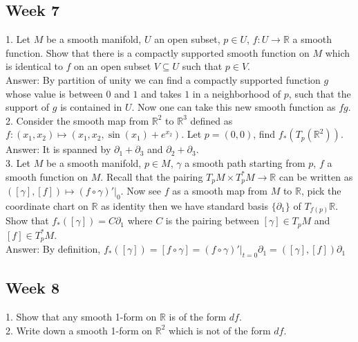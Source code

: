 \documentclass{article}
\theoremstyle{definition}
\begin{document}
\subsection{Week 7}

1. Let $M$ be a smooth manifold, $U$ an open subset, $p\in U$, $f: U\rightarrow \mathbb{R}$ a smooth function. Show that there is a compactly supported smooth function on $M$ which is identical to $f$ on an open subset $V\subseteq U$ such that $p\in V$.\\

Answer: By partition of unity we can find a compactly supported function $g$ whose value is between $0$ and $1$ and takes $1$ in a neighborhood of $p$, such that the support of $g$ is contained in $U$. Now one can take this new smooth function as $fg$.\\

2. Consider the smooth map from $\mathbb{R}^2$ to $\mathbb{R}^3$ defined as $f: (x_1, x_2)\mapsto (x_1, x_2, \sin(x_1)+e^{x_2})$. Let $p=(0, 0)$, find $f_*(T_p(\mathbb{R}^2))$.\\

Answer: It is spanned by $\partial_1+\partial_3$ and $\partial_2+\partial_3$.\\

3. Let $M$ be a smooth manifold, $p\in M$, $\gamma$ a smooth path starting from $p$, $f$ a smooth function on $M$. Recall that the pairing $T_pM\times T^*_pM\rightarrow \mathbb{R}$ can be written as $([\gamma], [f])\mapsto (f\circ \gamma)'|_0$. Now see $f$ as a smooth map from $M$ to $\mathbb{R}$, pick the coordinate chart on $\mathbb{R}$ as identity then we have standard basis $\{\partial_1\}$ of $T_{f(p)}\mathbb{R}$. Show that
$f_*([\gamma])=C\partial_1$ where $C$ is the pairing between $[\gamma]\in T_pM$ and $[f]\in T^*_pM$.\\

Answer: By definition, $f_*([\gamma])=[f\circ\gamma]=(f\circ\gamma)'|_{t=0}\partial_1=([\gamma], [f])\partial_1$

\subsection{Week 8}

1. Show that any smooth 1-form on $\mathbb{R}$ is of the form $df$.\\

2. Write down a smooth 1-form on $\mathbb{R}^2$ which is not of the form $df$.\\
\end{document}
